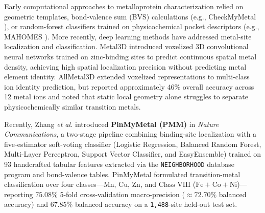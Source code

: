 \documentclass[10pt,a4paper,twocolumn]{article}
\begin{document}
Early computational approaches to metalloprotein characterization relied on geometric templates, bond-valence sum (BVS) calculations (e.g., CheckMyMetal \cite{zheng2017checkmymetal}), or random-forest classifiers trained on physicochemical pocket descriptors (e.g., MAHOMES \cite{feehan2021mahomes}). More recently, deep learning methods have addressed metal-site localization and classification. Metal3D \cite{durr2023metal3d} introduced voxelized 3D convolutional neural networks trained on zinc-binding sites to predict continuous spatial metal density, achieving high spatial localization precision without predicting metal element identity. AllMetal3D \cite{durr2025allmetal3d} extended voxelized representations to multi-class ion identity prediction, but reported approximately $46\%$ overall accuracy across 12 metal ions and noted that static local geometry alone struggles to separate physicochemically similar transition metals.

Recently, Zhang \textit{et al.} \cite{zhang2025pinmymetal} introduced \textbf{PinMyMetal (PMM)} in \textit{Nature Communications}, a two-stage pipeline combining binding-site localization with a five-estimator soft-voting classifier (Logistic Regression, Balanced Random Forest, Multi-Layer Perceptron, Support Vector Classifier, and EasyEnsemble) trained on 93 handcrafted tabular features extracted via the \texttt{NEIGHBORHOOD} database program and bond-valence tables. PinMyMetal formulated transition-metal classification over four classes---$\text{Mn}$, $\text{Cu}$, $\text{Zn}$, and $\text{Class VIII}$ ($\text{Fe} + \text{Co} + \text{Ni}$)---reporting $75.08\%$ 5-fold cross-validation macro-precision ($\approx 72.70\%$ balanced accuracy) and $67.85\%$ balanced accuracy on a \texttt{1,488}-site held-out test set.
\end{document}
